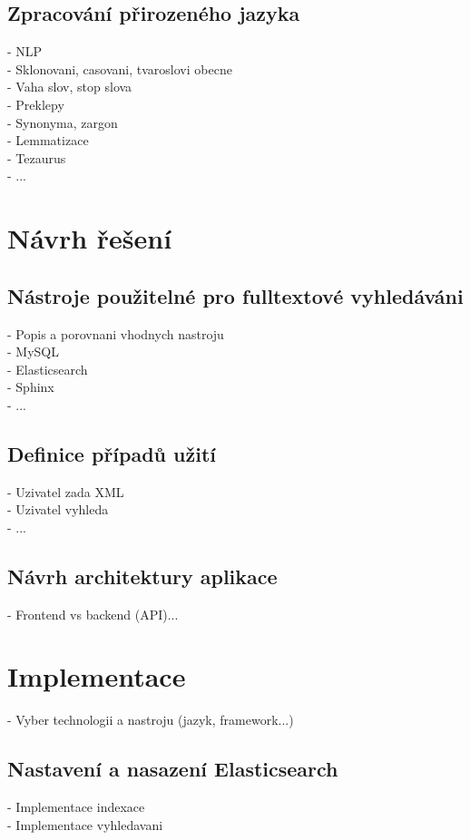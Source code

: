 \documentclass[FM,DP]{tulthesis}
\begin{document}
\section{Zpracování přirozeného jazyka}
- NLP\\
- Sklonovani, casovani, tvaroslovi obecne\\
- Vaha slov, stop slova\\
- Preklepy\\
- Synonyma, zargon\\
- Lemmatizace\\
- Tezaurus\\
- ...

\chapter{Návrh řešení}

\section{Nástroje použitelné pro fulltextové vyhledáváni}
- Popis a porovnani vhodnych nastroju\\
\hspace*{5mm}- MySQL\\
\hspace*{5mm}- Elasticsearch\\
\hspace*{5mm}- Sphinx\\
\hspace*{5mm}- ...

\section{Definice případů užití}
- Uzivatel zada XML\\
- Uzivatel vyhleda\\
- ...

\section{Návrh architektury aplikace}
- Frontend vs backend (API)...


\chapter{Implementace}
- Vyber technologii a nastroju (jazyk, framework...)

\section{Nastavení a nasazení Elasticsearch}
- Implementace indexace\\
- Implementace vyhledavani
\end{document}
